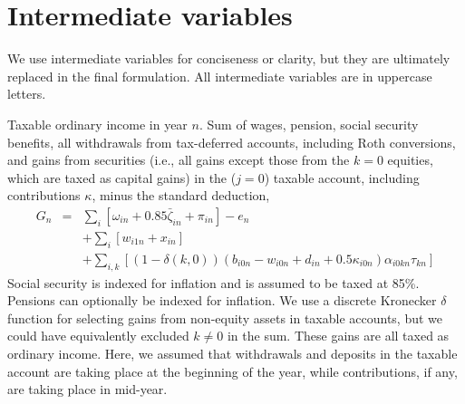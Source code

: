 \documentclass{report}[fleqn,11pt]
\begin{document}
\section{Intermediate variables}
We use intermediate variables for conciseness or clarity,
but they are ultimately replaced in the final formulation.
All intermediate variables are in uppercase letters.
\begin{description}[leftmargin=4em,style=multiline]
\item [$G_n$]
	Taxable ordinary income in year $n$. Sum of wages, pension, social security benefits, all withdrawals
	from tax-deferred accounts, including Roth conversions, and gains from securities
	(i.e., all gains except those from the $k=0$ equities, which are taxed as capital gains)
	in the ($j=0$) taxable account, including contributions $\kappa$, minus the standard deduction,
	\begin{eqnarray}
		\label{Eq:Tx2}
		G_n &=& 
		\sum_i [\omega_{in} + 0.85\bar\zeta_{in} + \pi_{in}]
		- e_n
		\nonumber \\
		&& + \sum_i [w_{i1n} + x_{in}]
		\nonumber \\
		&& + \sum_{i,k} 
		[(1-\delta(k, 0))(b_{i0n} - w_{i0n} + d_{in} + 0.5\kappa_{i0n})\alpha_{i0kn}\tau_{kn}]
	\end{eqnarray}
	Social security is indexed for inflation and is assumed to be taxed at 85\%.
	Pensions can optionally be indexed for inflation.
	We use a discrete Kronecker $\delta$ function for selecting gains from non-equity assets in
	taxable accounts, but we could have equivalently excluded $k \neq 0$ in the sum.
	These gains are all taxed as ordinary income. Here, we assumed that
	withdrawals and deposits in the taxable account are taking place at the beginning of the year, while
	contributions, if any, are taking place in mid-year.


\end{description}
\end{document}
